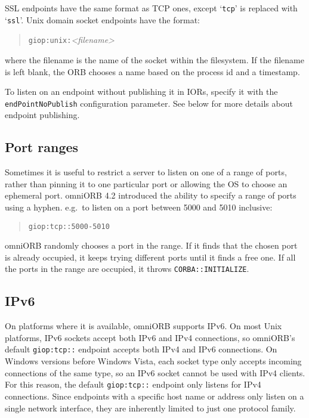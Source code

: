 \documentclass[11pt,oneside,a4paper]{book}
\newcommand{\code}[1]{\texttt{#1}}
\begin{document}
SSL endpoints have the same format as TCP ones, except `\code{tcp}'
is replaced with `\code{ssl}'. Unix domain socket endpoints have the
format:

\begin{quote}
\code{giop:unix:}\textit{<filename>}
\end{quote}

\noindent where the filename is the name of the socket within the
filesystem. If the filename is left blank, the ORB chooses a name
based on the process id and a timestamp.

To listen on an endpoint without publishing it in IORs, specify it
with the \code{endPointNoPublish} configuration parameter. See below
for more details about endpoint publishing.


\subsection{Port ranges}

Sometimes it is useful to restrict a server to listen on one of a
range of ports, rather than pinning it to one particular port or
allowing the OS to choose an ephemeral port. omniORB 4.2 introduced
the ability to specify a range of ports using a hyphen. e.g.\ to
listen on a port between 5000 and 5010 inclusive:

\begin{quote}
\code{giop:tcp::5000-5010}
\end{quote}

omniORB randomly chooses a port in the range. If it finds that the
chosen port is already occupied, it keeps trying different ports until
it finds a free one. If all the ports in the range are occupied, it
throws \code{CORBA::INITIALIZE}.


\subsection{IPv6}

On platforms where it is available, omniORB supports IPv6. On most
Unix platforms, IPv6 sockets accept both IPv6 and IPv4 connections, so
omniORB's default \code{giop:tcp::} endpoint accepts both IPv4 and
IPv6 connections. On Windows versions before Windows Vista, each
socket type only accepts incoming connections of the same type, so an
IPv6 socket cannot be used with IPv4 clients. For this reason, the
default \code{giop:tcp::} endpoint only listens for IPv4 connections.
Since endpoints with a specific host name or address only listen on a
single network interface, they are inherently limited to just one
protocol family.
\end{document}
